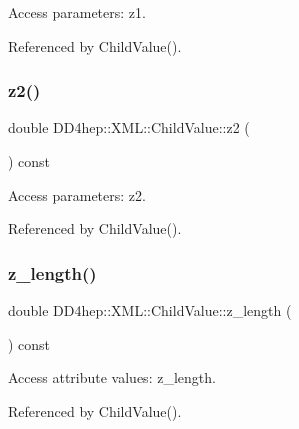 Access parameters\+: z1. 



Referenced by Child\+Value().

\hypertarget{struct_d_d4hep_1_1_x_m_l_1_1_child_value_a80540d279243a15e0ea3c16d56aaa9d9}{}\label{struct_d_d4hep_1_1_x_m_l_1_1_child_value_a80540d279243a15e0ea3c16d56aaa9d9} 
\subsubsection{\texorpdfstring{z2()}{z2()}}
{\footnotesize\ttfamily double D\+D4hep\+::\+X\+M\+L\+::\+Child\+Value\+::z2 (\begin{DoxyParamCaption}{ }\end{DoxyParamCaption}) const}



Access parameters\+: z2. 



Referenced by Child\+Value().

\hypertarget{struct_d_d4hep_1_1_x_m_l_1_1_child_value_ac3459bdc15d13dd5bc6248eed6eb6af7}{}\label{struct_d_d4hep_1_1_x_m_l_1_1_child_value_ac3459bdc15d13dd5bc6248eed6eb6af7} 
\subsubsection{\texorpdfstring{z\+\_\+length()}{z\_length()}}
{\footnotesize\ttfamily double D\+D4hep\+::\+X\+M\+L\+::\+Child\+Value\+::z\+\_\+length (\begin{DoxyParamCaption}{ }\end{DoxyParamCaption}) const}



Access attribute values\+: z\+\_\+length. 



Referenced by Child\+Value().

\hypertarget{struct_d_d4hep_1_1_x_m_l_1_1_child_value_a07ac9b1aa9a24713985e6ddd85a69fbe}{}\label{struct_d_d4hep_1_1_x_m_l_1_1_child_value_a07ac9b1aa9a24713985e6ddd85a69fbe} 
